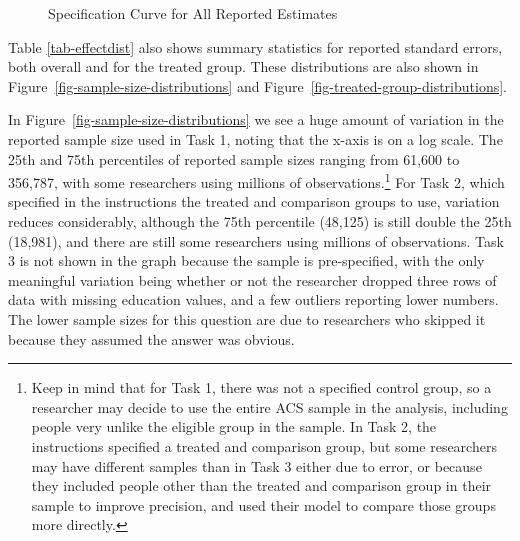 \documentclass[
  letterpaper,
  DIV=11,
  numbers=noendperiod]{scrartcl}
\begin{document}
\begin{figure}


\caption{\label{fig-full-effect-distribution}Specification Curve for All
Reported Estimates}

\end{figure}%

Table \ref{tab-effectdist} also shows summary statistics for reported
standard errors, both overall and for the treated group. These
distributions are also shown in
Figure~\ref{fig-sample-size-distributions} and
Figure~\ref{fig-treated-group-distributions}.

In Figure~\ref{fig-sample-size-distributions} we see a huge amount of
variation in the reported sample size used in Task 1, noting that the
x-axis is on a log scale. The 25th and 75th percentiles of reported
sample sizes ranging from 61,600 to 356,787, with some researchers using
millions of observations.\footnote{Keep in mind that for Task 1, there
  was not a specified control group, so a researcher may decide to use
  the entire ACS sample in the analysis, including people very unlike
  the eligible group in the sample. In Task 2, the instructions
  specified a treated and comparison group, but some researchers may
  have different samples than in Task 3 either due to error, or because
  they included people other than the treated and comparison group in
  their sample to improve precision, and used their model to compare
  those groups more directly.} For Task 2, which specified in the
instructions the treated and comparison groups to use, variation reduces
considerably, although the 75th percentile (48,125) is still double the
25th (18,981), and there are still some researchers using millions of
observations. Task 3 is not shown in the graph because the sample is
pre-specified, with the only meaningful variation being whether or not
the researcher dropped three rows of data with missing education values,
and a few outliers reporting lower numbers. The lower sample sizes for
this question are due to researchers who skipped it because they assumed
the answer was obvious.
\end{document}
